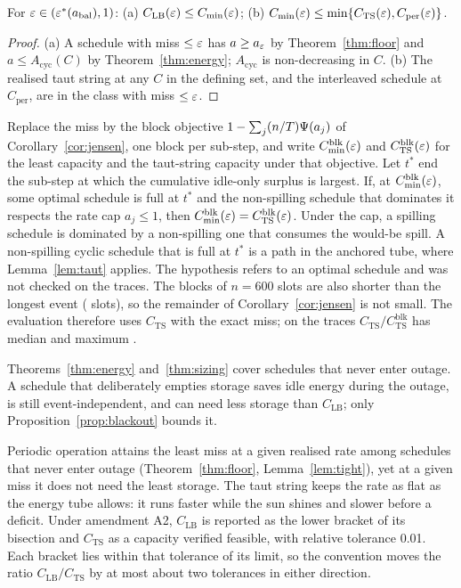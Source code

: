 \begin{theorem}\label{thm:sizing}
For $\varepsilon\in(\varepsilon^*(a_{\mathrm{bal}}),1)$:
(a) $C_{\mathrm{LB}}(\varepsilon)\le C_{\min}(\varepsilon)$;
(b) $C_{\min}(\varepsilon)\le\min\{C_{\mathrm{TS}}(\varepsilon),C_{\mathrm{per}}(\varepsilon)\}$.
\end{theorem}
\begin{proof}
(a) A schedule with miss $\le\varepsilon$ has $a\ge a_\varepsilon$ by Theorem~\ref{thm:floor} and $a\le A_{\mathrm{cyc}}(C)$ by Theorem~\ref{thm:energy}; $A_{\mathrm{cyc}}$ is non-decreasing in $C$.
(b) The realised taut string at any $C$ in the defining set, and the interleaved schedule at $C_{\mathrm{per}}$, are in the class with miss $\le\varepsilon$.
\end{proof}
\begin{remark}\label{rem:blk}
Replace the miss by the block objective $1-\sum_j(n/T)\Psi(a_j)$ of Corollary~\ref{cor:jensen}, one block per sub-step, and write $C^{\mathrm{blk}}_{\min}(\varepsilon)$ and $C^{\mathrm{blk}}_{\mathrm{TS}}(\varepsilon)$ for the least capacity and the taut-string capacity under that objective. Let $t^*$ end the sub-step at which the cumulative idle-only surplus is largest. If, at $C^{\mathrm{blk}}_{\min}(\varepsilon)$, some optimal schedule is full at $t^*$ and the non-spilling schedule that dominates it respects the rate cap $a_j\le1$, then $C^{\mathrm{blk}}_{\min}(\varepsilon)=C^{\mathrm{blk}}_{\mathrm{TS}}(\varepsilon)$. Under the cap, a spilling schedule is dominated by a non-spilling one that consumes the would-be spill. A non-spilling cyclic schedule that is full at $t^*$ is a path in the anchored tube, where Lemma~\ref{lem:taut} applies. The hypothesis refers to an optimal schedule and was not checked on the traces. The blocks of $n=600$ slots are also shorter than the longest event (\Dmax{} slots), so the remainder of Corollary~\ref{cor:jensen} is not small. The evaluation therefore uses $C_{\mathrm{TS}}$ with the exact miss; on the traces $C_{\mathrm{TS}}/C^{\mathrm{blk}}_{\mathrm{TS}}$ has median \AiiTSratioMed{} and maximum \AiiTSratioMax.
\end{remark}
\begin{remark}\label{rem:class}
Theorems~\ref{thm:energy} and~\ref{thm:sizing} cover schedules that never enter outage. A schedule that deliberately empties storage saves idle energy during the outage, is still event-independent, and can need less storage than $C_{\mathrm{LB}}$; only Proposition~\ref{prop:blackout} bounds it.
\end{remark}
\noindent Periodic operation attains the least miss at a given realised rate among schedules that never enter outage (Theorem~\ref{thm:floor}, Lemma~\ref{lem:tight}), yet at a given miss it does not need the least storage. The taut string keeps the rate as flat as the energy tube allows: it runs faster while the sun shines and slower before a deficit. Under amendment A2, $C_{\mathrm{LB}}$ is reported as the lower bracket of its bisection and $C_{\mathrm{TS}}$ as a capacity verified feasible, with relative tolerance 0.01. Each bracket lies within that tolerance of its limit, so the convention moves the ratio $C_{\mathrm{LB}}/C_{\mathrm{TS}}$ by at most about two tolerances in either direction.

